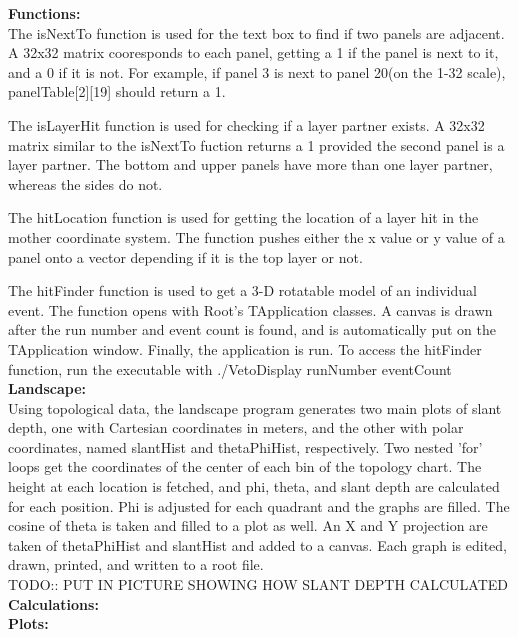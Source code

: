 \documentclass[a4paper,12pt]{article}
\begin{document}
\textbf{Functions:} \\
	The isNextTo function is used for the text box to find if two panels are adjacent. A 32x32 matrix cooresponds to each panel, getting a 1 if the panel is next to it, and a 0 if it is not. For example, if panel 3 is next to panel 20(on the 1-32 scale), panelTable[2][19] should return a 1. 

The isLayerHit function is used for checking if a layer partner exists. A 32x32 matrix similar to the isNextTo fuction returns a 1 provided the second panel is a layer partner. The bottom and upper panels have more than one layer partner, whereas the sides do not.

The hitLocation function is used for getting the location of a layer hit in the mother coordinate system. The function pushes either the x value or y value of a panel onto a vector depending if it is the top layer or not.

The hitFinder function is used to get a 3-D rotatable model of an individual event. The function opens with Root's TApplication classes. A canvas is drawn after the run number and event count is found, and is automatically put on the TApplication window. Finally, the application is run. To access the hitFinder function, run the executable with ./VetoDisplay runNumber eventCount \\

\textbf{Landscape:} \\
Using topological data, the landscape program generates two main plots of slant depth, one with Cartesian coordinates in meters, and the other with polar coordinates, named slantHist and thetaPhiHist, respectively. Two nested 'for' loops get the coordinates of the center of each bin of the topology chart. The height at each location is fetched, and phi, theta, and slant depth are calculated for each position.
Phi is adjusted for each quadrant and the graphs are filled. The cosine of theta is taken and filled to a plot as well. An X and Y projection are taken of thetaPhiHist and slantHist and added to a canvas. Each graph is edited, drawn, printed, and written to a root file. \\
TODO:: PUT IN PICTURE SHOWING HOW SLANT DEPTH CALCULATED \\
\textbf{Calculations:} \\


\textbf{Plots:} \\
\end{document}
